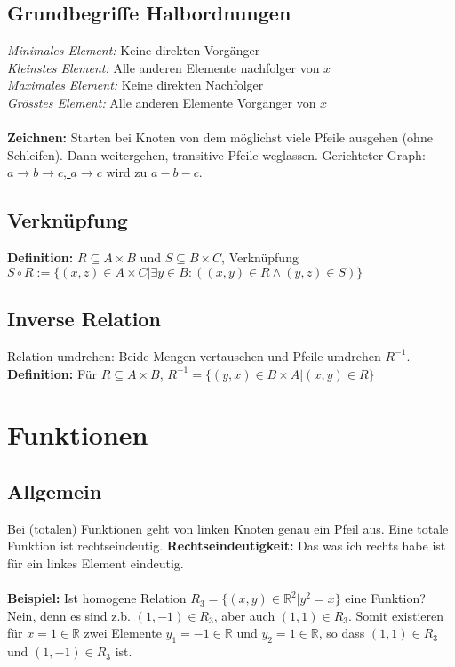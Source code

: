 \documentclass[8pt,landscape]{scrartcl}
\begin{document}
\begin{multicols}{3}
\subsection{Grundbegriffe Halbordnungen}
\textit{Minimales Element:} Keine direkten Vorg\"anger\\
\textit{Kleinstes Element:} Alle anderen Elemente nachfolger von $x$\\
\textit{Maximales Element:} Keine direkten Nachfolger\\
\textit{Gr\"osstes Element:} Alle anderen Elemente Vorg\"anger von $x$\\\\
\textbf{Zeichnen:} Starten bei Knoten von dem m\"oglichst viele Pfeile ausgehen (ohne Schleifen).
Dann weitergehen, transitive Pfeile weglassen.
Gerichteter Graph: \underline{$a \rightarrow b \rightarrow c$, $a \rightarrow c$} wird zu $a - b - c$.

\subsection{Verkn\"upfung}
\textbf{Definition:} $R \subseteq A \times B$ und $S \subseteq B \times C$, Verkn\"upfung\\
$S \circ R := \{ (x, z) \in A \times C | \exists y \in B : ( (x, y) \in R \land (y, z) \in S ) \}$

\subsection{Inverse Relation}
Relation umdrehen: Beide Mengen vertauschen und Pfeile umdrehen $R^{-1}$.\\
\textbf{Definition:} F\"ur $R \subseteq A \times B$, $R^{-1} = \{ (y, x) \in B \times A | (x, y) \in R \}$




\section{Funktionen}

\subsection{Allgemein}
Bei (totalen) Funktionen geht von linken Knoten genau ein Pfeil aus.
Eine totale Funktion ist rechtseindeutig.
\textbf{Rechtseindeutigkeit:} Das was ich rechts habe ist für ein linkes Element eindeutig.\\\\
\textbf{Beispiel:} Ist homogene Relation $R_3 = \{ (x, y) \in \mathbb{R}^2 | y^2 = x \}$ eine Funktion?\\
Nein, denn es sind z.b. $(1, -1) \in R_3$, aber auch $(1, 1) \in R_3$.
Somit existieren f\"ur $x=1 \in \mathbb{R}$ zwei Elemente $y_1 = -1 \in \mathbb{R}$ und $y_2 = 1 \in \mathbb{R}$, so dass $(1, 1) \in R_3$ und $(1, -1) \in R_3$ ist.




\end{multicols}
\end{document}
